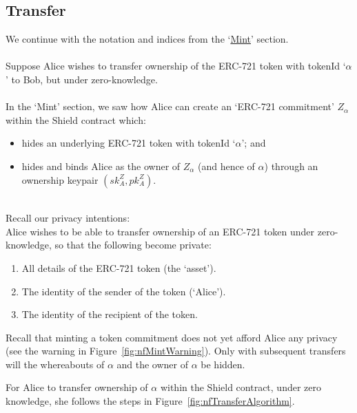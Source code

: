 \subsection{Transfer}
\label{sec:721Transfer}

\sectlof
We continue with the notation and indices from the `\hyperref[sec:Mint]{Mint}' section.\\
\\
Suppose Alice wishes to transfer ownership of the ERC-721 token with tokenId `$\alpha$' to Bob, but under zero-knowledge.\\
\\
In the `Mint' section, we saw how Alice can create an `ERC-721 commitment' $Z_\alpha$ within the Shield contract which:
\begin{itemize}
  \item hides an underlying ERC-721 token with tokenId `$\alpha$'; and
  \item hides and binds Alice as the owner of $Z_\alpha$ (and hence of $\alpha$) through an ownership keypair $(sk_A^Z, pk_A^Z)$.
\end{itemize}
\ \\
Recall our privacy intentions:\\
Alice wishes to be able to transfer ownership of an ERC-721 token under zero-knowledge, so that the following become private:
	\begin{center}
		\begin{framed}
      \begin{enumerate}
        \item All details of the ERC-721 token (the `asset').
        \item The identity of the sender of the token (`Alice').
        \item The identity of the recipient of the token.
      \end{enumerate}
    \end{framed}
  \end{center}
Recall that minting a token commitment does not yet afford Alice any privacy (see the warning in Figure~\ref{fig:nfMintWarning}). Only with subsequent transfers will the whereabouts of $\alpha$ and the owner of $\alpha$ be hidden.

For Alice to transfer ownership of $\alpha$ within the Shield contract, under zero knowledge, she follows the steps in Figure~\ref{fig:nfTransferAlgorithm}.


